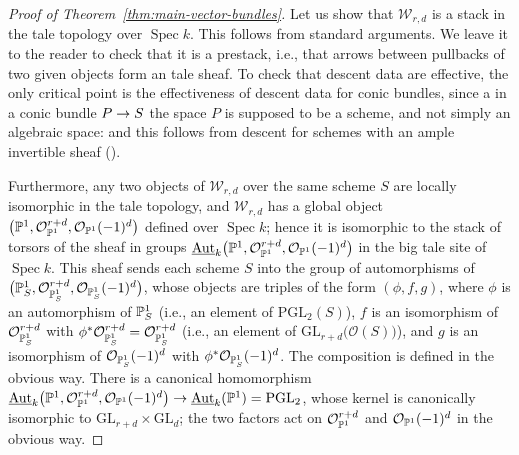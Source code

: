 \documentclass{amsart}
\numberwithin{equation}{section}
\numberwithin{subsection}{section}
\theoremstyle{definition}
\theoremstyle{remark}
\newcommand\cO{\mathcal{O}} \newcommand\cP{\mathcal{P}}
\newcommand\cW{\mathcal{W}} \newcommand\cX{\mathcal{X}}
\newcommand\arr{\ifinner\to\else\longrightarrow\fi}
\newcommand\spec{\operatorname{Spec}}
\newcommand{\underaut}
{\mathop{\underline{\mathrm{Aut}}}\nolimits}
\newcommand{\vectaux}[1][r,d]{\cW_{#1}}
\newcommand{\GL}{\mathrm{GL}}
\newcommand{\PGL}{\mathrm{PGL}}
\begin{document}
\begin{proof}[Proof of Theorem~\ref{thm:main-vector-bundles}]
Let us show that $\vectaux$ is a stack in the tale topology over $\spec k$. This follows from standard arguments. We leave it to the reader to check that it is a prestack, i.e., that arrows between pullbacks of two given objects form an tale sheaf. To check that descent data are effective, the only critical point is the effectiveness of descent data for conic bundles, since a in a conic bundle $P \arr S$ the space $P$ is supposed to be a scheme, and not simply an algebraic space: and this follows from descent for schemes with an ample invertible sheaf (\cite[Example~4.39]{fga-explained}).

Furthermore, any two objects of $\vectaux$ over the same scheme $S$ are locally isomorphic in the tale topology, and $\vectaux$ has a global object $\bigl(\PP^{1}, \cO_{\PP^{1}}^{r+d}, \cO_{\PP^{1}}(-1)^{d}\bigr)$ defined over $\spec k$; hence it is isomorphic to the stack of torsors of the sheaf in groups $\underaut_{k}\bigl(\PP^{1}, \cO_{\PP^{1}}^{r+d}, \cO_{\PP^{1}}(-1)^{d}\bigr)$ in the big tale site of $\spec k$. This sheaf sends each scheme $S$ into the group of automorphisms of $\bigl(\PP^{1}_{S}, \cO_{\PP^{1}_{S}}^{r+d}, \cO_{\PP^{1}_{S}}(-1)^{d}\bigr)$, whose objects are triples of the form $(\phi, f, g)$, where $\phi$ is an automorphism of $\mathbb{P}^{1}_{S}$ (i.e., an element of $\PGL_{2}(S)$), $f$ is an isomorphism of $\cO_{\PP^{1}_{S}}^{r+d}$ with $\phi^*\cO_{\PP^{1}_{S}}^{r+d} = \cO_{\PP^{1}_{S}}^{r+d}$ (i.e., an element of $\GL_{r+d}\bigl(\cO(S)\bigr)$), and $g$ is an isomorphism of $\cO_{\PP^{1}_{S}}(-1)^{d}$ with $\phi^{*}\cO_{\PP^{1}_{S}}(-1)^{d}$. The composition is defined in the obvious way. There is a canonical homomorphism $\underaut_{k}\bigl(\PP^{1}, \cO_{\PP^{1}}^{r+d}, \cO_{\PP^{1}}(-1)^{d}\bigr) \arr \underaut_{k}(\PP^{1}) = \PGL_{2}$, whose kernel is canonically isomorphic to $\GL_{r+d} \times \GL_{d}$; the two factors act on $\cO_{\PP^{1}}^{r+d}$ and $\cO_{\PP^{1}}(-1)^{d}$ in the obvious way. 


\end{proof}
\end{document}
